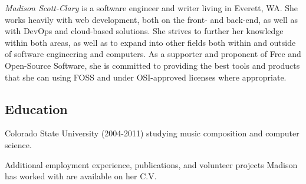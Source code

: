 \documentclass[letterpaper]{memoir}
\begin{document}


\textit{\large Madison Scott-Clary} is a software engineer and writer living in Everett, WA. She works heavily with web development, both on the front- and back-end, as well as with DevOps and cloud-based solutions. She strives to further her knowledge within both areas, as well as to expand into other fields both within and outside of software engineering and computers. As a supporter and proponent of Free and Open-Source Software, she is committed to providing the best tools and products that she can using FOSS and under OSI-approved licenses where appropriate.



\subsection{Education}\label{education}

\begin{description}
\tightlist
\item[University] \hfill
Colorado State University (2004-2011) studying music composition and
computer science.
\end{description}

Additional employment experience, publications, and volunteer projects
Madison has worked with are available on her C.V.
\end{document}
